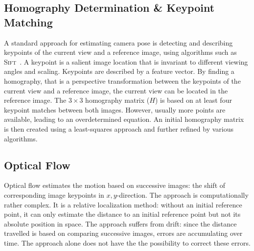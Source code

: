 \subsection{Homography Determination \& Keypoint Matching}
\label{sec:keypointmatching}

A standard approach for estimating camera pose is detecting and
describing keypoints of the current view and a reference image, using
algorithms such as \textsc{Sift}~\cite{lowe1999object}. A
keypoint is a salient image location that is invariant to different
viewing angles and scaling. Keypoints are described by a feature vector. By finding a homography, that is a perspective transformation between the keypoints of the current view and a reference image, the current view can be located in the reference image. The $3 \times 3$
homography matrix ($H$) is based on at least four keypoint matches
between both images. However, usually more points are available,
leading to an overdetermined equation. An initial homography matrix is
then created using a least-squares approach and further refined by
various algorithms.


\subsection{Optical Flow}
\label{sec:opticalflow}

Optical flow estimates the motion based on successive images: the shift of corresponding image keypoints in $x,y$-direction.
The approach is computationally rather complex. It is a relative localization method: without an initial reference point, it can only estimate the distance to an initial reference point but not its absolute position in space. The approach suffers from drift: since the distance travelled is based on comparing successive images, errors are accumulating over time. The approach alone does not have the  the possibility to correct these errors.
